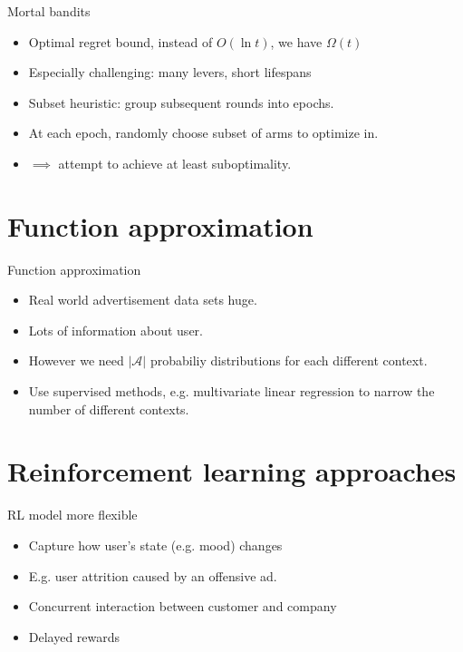 \documentclass{beamer}
\begin{document}
\begin{frame}{Mortal bandits}
  \begin{itemize}
    \item{Optimal regret bound, instead of $O(\ln t)$, we have $\Omega(t)$}
    \item{Especially challenging: many levers, short lifespans}
    \item{Subset heuristic: group subsequent rounds into epochs.}
    \item{At each epoch, randomly choose subset of arms to optimize in.}
    \item{$\implies$ attempt to achieve at least suboptimality.}
  \end{itemize}
\end{frame}

\section{Function approximation}
\frame{\sectionpage}

\begin{frame}{Function approximation}
  \begin{itemize}
    \item{Real world advertisement data sets huge.}
    \item{Lots of information about user.}
    \item{However we need $|\mathcal{A}|$ probabiliy distributions for each
        different context.}
      \item{Use supervised methods, e.g. multivariate linear regression to
        narrow the number of different contexts.}
  \end{itemize}
\end{frame}

\section{Reinforcement learning approaches}
\frame{\sectionpage}

\begin{frame}{RL model more flexible}
  \begin{itemize}
    \item{Capture how user's state (e.g. mood) changes}
    \item{E.g. user attrition caused by an offensive ad.}
    \item{Concurrent interaction between customer and company}
    \item{Delayed rewards}
  \end{itemize}
\end{frame}
\end{document}
